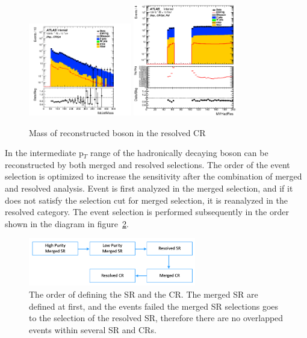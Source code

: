\begin{figure}[H]
    \centering
    \includegraphics[width=0.4\textwidth]{figures/2lep/dataMC/C_0ptag1pfat0pjet_0ptv_CRVjet_fatJetMass_Log}
    \includegraphics[width=0.4\textwidth]{figures/2lep/dataMC/C_0ptag2pjet_0ptv_CRVjet_Fid_MVHadRes_Log}
    \caption{Mass of reconstructed boson in the resolved CR}
    \label{fig:CRVjet}
\end{figure}

In the intermediate p$_T$ range of the hadronically decaying boson can be reconstructed by both merged and resolved selections.
The order of the event selection is optimized to increase the sensitivity after the combination of merged and resolved analysis. 
Event is first analyzed in the merged selection, and if it does not satisfy the selection cut for merged selection, it is reanalyzed in the resolved category.
The event selection is performed subsequently in the order shown in the diagram in figure~\ref{fig:order}.
\begin{figure}[H]
    \centering
    \includegraphics[width=0.65\textwidth]{figures/order}
    \caption{The order of defining the SR and the CR. The merged SR are defined at first, and the events failed the merged SR selections goes to the selection of the resolved SR, therefore there are no overlapped events within several SR and CRs.}
    \label{fig:order}
\end{figure}

